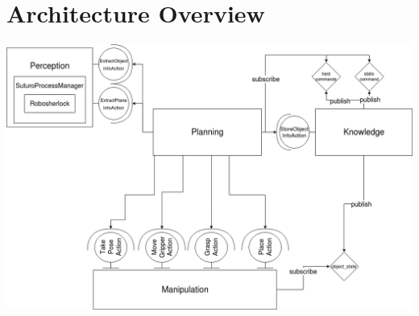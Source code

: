 \documentclass[main.tex]{subfiles}
\begin{document}
	\begingroup

	\renewcommand{\cleardoublepage}{}

	\renewcommand{\clearpage}{}

	\chapter{Architecture Overview}


	

	

  	\includegraphics[width=\textwidth, ]{architecture/architecture.png}		  	

	\endgroup
\end{document}
